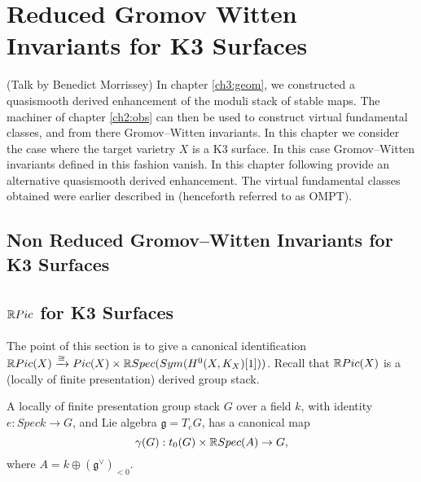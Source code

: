 \chapter{Reduced Gromov Witten Invariants for K3 Surfaces}
\label{ch4:k3}

(Talk by Benedict Morrissey)  In chapter \ref{ch3:geom}, we constructed a quasismooth derived enhancement of the moduli stack of stable maps.  The machiner of chapter \ref{ch2:obs} can then be used to construct virtual fundamental classes, and from there Gromov--Witten invariants.  In this chapter we consider the case where the target varietry $X$ is a K3 surface.  In this case Gromov--Witten invariants defined in this fashion vanish.  In this chapter following \cite{schurg2015derived} provide an alternative quasismooth derived enhancement.  The virtual fundamental classes obtained were earlier described in \cite{maulik2007gromov, maulik2010curves, okounkov2010quantum} (henceforth referred to as OMPT).

\section{Non Reduced Gromov--Witten Invariants for K3 Surfaces}


\section{$\mathbb R Pic$ for K3 Surfaces}

The point of this section is to give a canonical identification $\mathbb R Pic(X)\xrightarrow{\cong}Pic(X)\times \mathbb R Spec(Sym(H^{0}(X,K_{X})[1]))$.  Recall that $\mathbb R Pic(X)$ is a (locally of finite presentation) derived group stack.

\begin{thm}
\label{thm:derivedgroup}
A locally of finite presentation group stack $G$ over a field $k$, with identity $e: Spec k\rightarrow G$, and Lie algebra $\mathfrak{g}=T_{e}G$, has a canonical map
\[\gamma(G):t_{0}(G)\times \mathbb R Spec(A)\rightarrow G,\]
where $A=k\oplus (\mathfrak{g}^{\vee})_{<0}$.
\end{thm}

